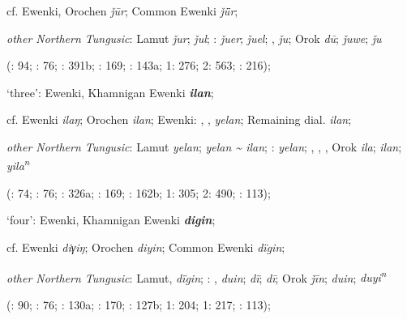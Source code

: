\documentclass[output=paper,colorlinks,citecolor=brown]{langscibook}
\begin{document}
\begin{xlist}
\begin{xlist}
    cf.  Ewenki, Orochen \textit{ǰūr};  Common Ewenki \textit{ǰǖr};

    \textit{other Northern Tungusic}: Lamut \textit{ǰur};  \textit{ǰul}; \textit{}:  \textit{ǰuer};  \textit{ǰuel}; ,  \textit{ǰu}; Orok \textit{dū};  \textit{ǰuwe};  \textit{ǰu}
    
    (\citealt{Castrén1856}: 94; \citealt{Janhunen1991}: 76; \citealt{Dorji1998}: 391b; \citealt{Chaoke2014a}: 169; \citealt{Vasilevic1958}: 143a; \citealt{Cincius1975B} 1: 276; \citealt{Hauer1952} 2: 563; \citealt{Zikmundová2013a}: 216);

    \ex ‘three’:  Ewenki, Khamnigan Ewenki \textbf{\textit{ilan}};

    cf.  Ewenki \textit{ilaŋ}; Orochen \textit{ilan};  Ewenki: , ,  \textit{yelan}; Remaining dial. \textit{ilan};

    \textit{other Northern Tungusic}: Lamut \textit{yelan};  \textit{yelan {\textasciitilde} ilan}; \textit{}:  \textit{yelan}; , , , Orok \textit{ila};  \textit{ilan};  \textit{yila\textsuperscript{n}} 
    
    (\citealt{Castrén1856}: 74; \citealt{Janhunen1991}: 76; \citealt{Dorji1998}: 326a; \citealt{Chaoke2014a}: 169; \citealt{Vasilevic1958}: 162b; \citealt{Cincius1975B} 1: 305; \citealt{Hauer1952} 2: 490; \citealt{Zikmundová2013a}: 113);

    \ex ‘four’:  Ewenki, Khamnigan Ewenki \textbf{\textit{digin}};

    cf.  Ewenki \textit{diγiŋ}; Orochen \textit{diyin};  Common Ewenki \textit{dïgin};

    \textit{other Northern Tungusic}: Lamut,  \textit{dïgin}; \textit{}: ,  \textit{duin};  \textit{dï};  \textit{dī}; Orok \textit{ǰīn};  \textit{duin};  \textit{duyi\textsuperscript{n}}
    
    (\citealt{Castrén1856}: 90; \citealt{Janhunen1991}: 76; \citealt{Dorji1998}: 130a; \citealt{Chaoke2014a}: 170; \citealt{Vasilevic1958}: 127b; \citealt{Cincius1975B} 1: 204; \citealt{Hauer1952} 1: 217; \citealt{Zikmundová2013a}: 113);


\end{xlist}
\end{xlist}
\end{document}
